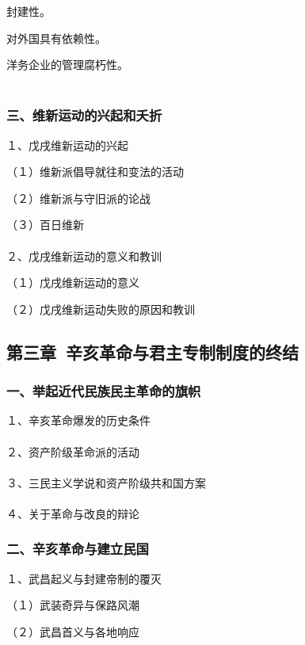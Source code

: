 \documentclass{ctexart}
\begin{document}
封建性。

对外国具有依赖性。

洋务企业的管理腐朽性。
\\\\


\subsubsection{三、维新运动的兴起和夭折}

１、戊戌维新运动的兴起

（１）维新派倡导就往和变法的活动

（２）维新派与守旧派的论战

（３）百日维新
\\\\

２、戊戌维新运动的意义和教训

（１）戊戌维新运动的意义

（２）戊戌维新运动失败的原因和教训

\subsection{第三章\ 辛亥革命与君主专制制度的终结}

\subsubsection{一、举起近代民族民主革命的旗帜}

１、辛亥革命爆发的历史条件
\\\\

２、资产阶级革命派的活动
\\\\

３、三民主义学说和资产阶级共和国方案
\\\\

４、关于革命与改良的辩论

\subsubsection{二、辛亥革命与建立民国}

１、武昌起义与封建帝制的覆灭

（１）武装奇异与保路风潮

（２）武昌首义与各地响应
\\\\
\end{document}
